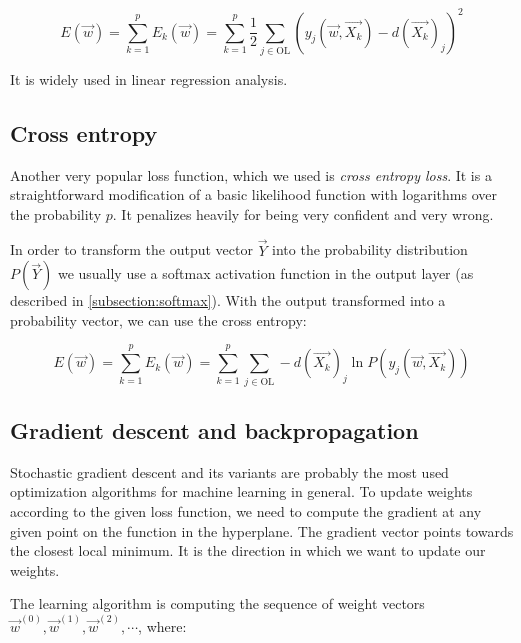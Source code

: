 $$ E(\overrightarrow{w}) = \sum_{k=1}^{p} E_k(\overrightarrow{w}) = \sum_{k=1}^{p} \frac{1}{2} \sum_{j \in \text{OL}} (y_j(\overrightarrow{w}, \overrightarrow{X_k}) - d(\overrightarrow{X_k})_j)^2 $$

\noindent
It is widely used in linear regression analysis.

\subsection*{Cross entropy}

Another very popular loss function, which we used is \textit{cross entropy loss}\cite{cross_entropy}. It is a straightforward modification of a basic likelihood function with logarithms over the probability $p$. It penalizes heavily for being very confident and very wrong. 

In order to transform the output vector $\overrightarrow{Y}$ into the probability distribution $P(\overrightarrow{Y})$ we usually use a softmax activation function in the output layer (as described in \autoref{subsection:softmax}). With the output transformed into a probability vector, we can use the cross entropy:

$$ E(\overrightarrow{w}) =  \sum_{k=1}^{p} E_k(\overrightarrow{w}) = \sum_{k=1}^{p} \sum_{j \in \text{OL}} - d(\overrightarrow{X_k})_j \ln{P(y_j(\overrightarrow{w}, \overrightarrow{X_k}))}$$

\subsection{Gradient descent and backpropagation}

Stochastic gradient descent\cite{deep_learning_SGD} and its variants are probably the most used optimization algorithms for machine learning in general. To update weights according to the given loss function, we need to compute the gradient at any given point on the function in the hyperplane. The gradient vector points towards the closest local minimum. It is the direction in which we want to update our weights.

The learning algorithm is computing the sequence of weight vectors $\overrightarrow{w}^{(0)}, \overrightarrow{w}^{(1)}, \overrightarrow{w}^{(2)}, \cdots$, where:

